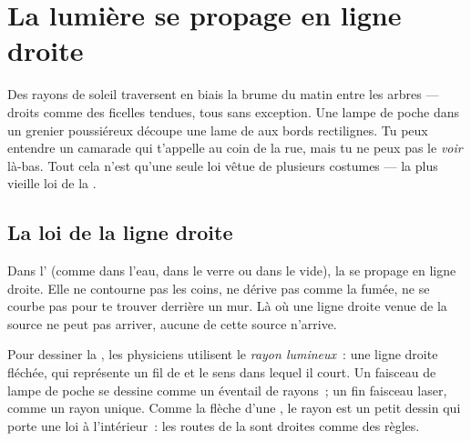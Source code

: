 \chapter{La lumière se propage en ligne droite}\label{ch:g4:light-straight-lines}

Des rayons de soleil traversent en biais la brume du matin entre les
arbres --- droits comme des ficelles tendues, tous sans exception.
Une lampe de poche dans un grenier poussiéreux découpe une lame de
 aux bords rectilignes. Tu peux entendre un camarade qui
t'appelle au coin de la rue, mais tu ne peux pas le \emph{voir}
là-bas. Tout cela n'est qu'une seule loi vêtue de plusieurs
costumes --- la plus vieille loi de la .

\section{La loi de la ligne droite}

\begin{proposition}\label{prop:g4:light-straight-lines:law}
Dans l' (comme dans l'eau, dans le verre ou dans le vide), la
 se propage en ligne droite. Elle ne contourne pas les coins,
ne dérive pas comme la fumée, ne se courbe pas pour te trouver
derrière un mur. Là où une ligne droite venue de la source ne peut
pas arriver, aucune  de cette source n'arrive.
\end{proposition}

\begin{definition}\label{def:g4:light-straight-lines:ray}
Pour dessiner la , les physiciens utilisent le \emph{rayon
lumineux}~: une ligne droite fléchée, qui
représente un fil de  et le sens dans lequel il court. Un
faisceau de lampe de poche se dessine comme un éventail de rayons~;
un fin faisceau laser, comme un rayon unique. Comme la flèche d'une
, le rayon est un petit dessin qui porte une loi à l'intérieur~:
les routes de la  sont droites comme des règles.
\end{definition}

